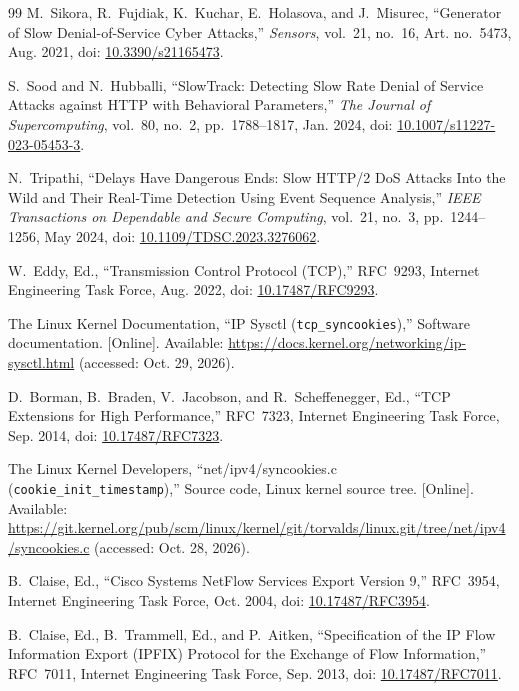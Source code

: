 \documentclass[a4paper,12pt]{article}
\begin{document}
\begin{thebibliography}{99}
M.~Sikora, R.~Fujdiak, K.~Kuchar, E.~Holasova, and J.~Misurec, ``Generator of Slow Denial-of-Service Cyber Attacks,'' \textit{Sensors}, vol.~21, no.~16, Art. no.~5473, Aug. 2021, doi: \href{https://doi.org/10.3390/s21165473}{10.3390/s21165473}.

S.~Sood and N.~Hubballi, ``SlowTrack: Detecting Slow Rate Denial of Service Attacks against HTTP with Behavioral Parameters,'' \textit{The Journal of Supercomputing}, vol.~80, no.~2, pp.~1788--1817, Jan. 2024, doi: \href{https://doi.org/10.1007/s11227-023-05453-3}{10.1007/s11227-023-05453-3}.

N.~Tripathi, ``Delays Have Dangerous Ends: Slow HTTP/2 DoS Attacks Into the Wild and Their Real-Time Detection Using Event Sequence Analysis,'' \textit{IEEE Transactions on Dependable and Secure Computing}, vol.~21, no.~3, pp.~1244--1256, May 2024, doi: \href{https://doi.org/10.1109/TDSC.2023.3276062}{10.1109/TDSC.2023.3276062}.

W.~Eddy, Ed., ``Transmission Control Protocol (TCP),'' RFC~9293, Internet Engineering Task Force, Aug. 2022, doi: \href{https://doi.org/10.17487/RFC9293}{10.17487/RFC9293}.

The Linux Kernel Documentation, ``IP Sysctl (\texttt{tcp\_syncookies}),'' Software documentation. [Online]. Available: \url{https://docs.kernel.org/networking/ip-sysctl.html} (accessed: Oct. 29, 2026).

D.~Borman, B.~Braden, V.~Jacobson, and R.~Scheffenegger, Ed., ``TCP Extensions for High Performance,'' RFC~7323, Internet Engineering Task Force, Sep. 2014, doi: \href{https://doi.org/10.17487/RFC7323}{10.17487/RFC7323}.

The Linux Kernel Developers, ``net/ipv4/syncookies.c (\texttt{cookie\_init\_timestamp}),'' Source code, Linux kernel source tree. [Online]. Available: \url{https://git.kernel.org/pub/scm/linux/kernel/git/torvalds/linux.git/tree/net/ipv4/syncookies.c} (accessed: Oct. 28, 2026).

B.~Claise, Ed., ``Cisco Systems NetFlow Services Export Version 9,'' RFC~3954, Internet Engineering Task Force, Oct. 2004, doi: \href{https://doi.org/10.17487/RFC3954}{10.17487/RFC3954}.

B.~Claise, Ed., B.~Trammell, Ed., and P.~Aitken, ``Specification of the IP Flow Information Export (IPFIX) Protocol for the Exchange of Flow Information,'' RFC~7011, Internet Engineering Task Force, Sep. 2013, doi: \href{https://doi.org/10.17487/RFC7011}{10.17487/RFC7011}.


\end{thebibliography}
\end{document}
